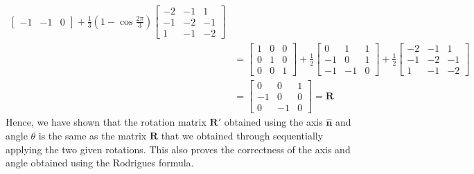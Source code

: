 \documentclass[10pt]{article}
\newcommand{\unit}[1]{\mathbf{\hat{#1}}}
\begin{document}
\begin{enumerate}
\begin{align*}
\begin{bmatrix}
                -1 & -1 & 0
            \end{bmatrix} + \frac{1}{3} \left(1 - \cos{\frac{2\pi}{3}} \right) \begin{bmatrix}
                -2 & -1 & 1 \\
                -1 & -2 & -1 \\
                1 & -1 & -2
            \end{bmatrix} \\
            &= \begin{bmatrix}
                1 & 0 & 0 \\
                0 & 1 & 0 \\
                0 & 0 & 1
            \end{bmatrix} + \frac{1}{2} \begin{bmatrix}
                0 & 1 & 1 \\
                -1 & 0 & 1 \\
                -1 & -1 & 0
            \end{bmatrix} + \frac{1}{2} \begin{bmatrix}
                -2 & -1 & 1 \\
                -1 & -2 & -1 \\
                1 & -1 & -2
            \end{bmatrix} \\
            &= \begin{bmatrix}
                0 & 0 & 1 \\
                -1 & 0 & 0 \\
                0 & -1 & 0
            \end{bmatrix} = \mathbf{R}
        \end{align*}
        Hence, we have shown that the rotation matrix $\mathbf{R'}$ obtained using the axis
        $\unit{n}$ and angle $\theta$ is the same as the matrix $\mathbf{R}$ that we obtained
        through sequentially applying the two given rotations. This also proves the correctness
        of the axis and angle obtained using the Rodrigues formula.
    \end{enumerate}
\end{document}
